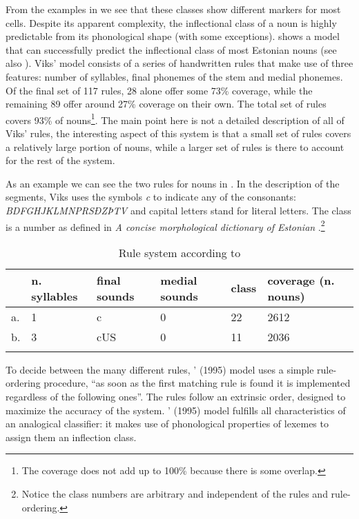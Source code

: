 From the examples in  we see that these classes show different markers for most cells. Despite its apparent complexity, the inflectional class of a noun is highly predictable from its phonological shape (with some exceptions). \textcite{Viks.1995} shows a model that can successfully predict the inflectional class of most Estonian nouns (see also \citealt{Viks.1994}). Viks' model consists of a series of handwritten rules that make use of three features: number of syllables, final phonemes of the stem and medial phonemes. Of the final set of 117 rules, 28 alone offer some 73\% coverage, while the remaining 89 offer around 27\% coverage on their own. The total set of rules covers 93\% of nouns\footnote{The coverage does not add up to 100\% because there is some overlap.}. The main point here is not a detailed description of all of Viks' rules, the interesting aspect of this system is that a small set of rules covers a relatively large portion of nouns, while a larger set of rules is there to account for the rest of the system.

As an example we can see the two rules for nouns in . In the description of the segments, Viks uses the symbols \textit{c} to indicate any of the consonants: \textit{BDFGHJKLMNPRSÐZÞTV} and capital letters stand for literal letters. The class is a number as defined in \textit{A concise morphological dictionary of Estonian} \autocite{Viks.1992}.\footnote{Notice the class numbers are arbitrary and independent of the rules and rule-ordering.}

\begin{table}[t]
    \centering
    \caption{Rule system according to \textcite{Viks.1992}}\label{tab:exe-rules-viks}
    \begin{tabular}[t]{llllll}
      \lsptoprule
      & n. syllables & final sounds & medial sounds & class & coverage (n. nouns) \\
      \midrule
      a. & 1                   & c            & 0             & 22            & 2612          \\
      b. & 3                   & cUS          & 0             & 11            & 2036          \\
      \lspbottomrule
    \end{tabular}
\end{table}

To decide between the many different rules, \citeauthor{Viks.1995}' (1995) model uses a simple rule-ordering procedure, ``as soon as the first matching rule is found it is implemented regardless of the following ones''. The rules follow an extrinsic order, designed to maximize the accuracy of the system. \citeauthor{Viks.1995}' (1995) model fulfills all characteristics of an analogical classifier: it makes use of phonological properties of lexemes to assign them an inflection class.

